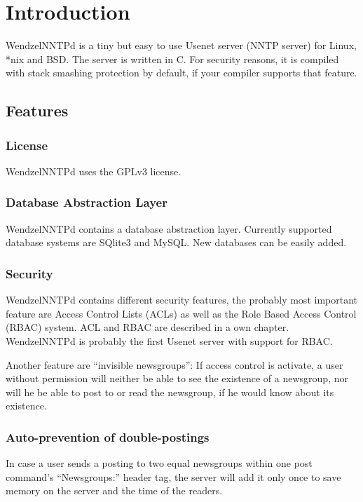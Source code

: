 \chapter{Introduction}

WendzelNNTPd is a tiny but easy to use Usenet server (NNTP server) for Linux, *nix and BSD. The server is written in C. For security reasons, it is compiled with stack smashing protection by default, if your compiler supports that feature.

\section{Features}

\subsection{License}

WendzelNNTPd uses the GPLv3 license.

\subsection{Database Abstraction Layer}

WendzelNNTPd contains a database abstraction layer. Currently supported database systems are SQlite3 and MySQL. New databases can be easily added.

\subsection{Security}

WendzelNNTPd contains different security features, the probably most important feature are Access Control Lists (ACLs) as well as the Role Based Access Control (RBAC) system. ACL and RBAC are described in a own chapter. WendzelNNTPd is probably the first Usenet server with support for RBAC.

Another feature are ``invisible newsgroups'': If access control is activate, a user without permission will neither be able to see the existence of a newsgroup, nor will he be able to post to or read the newsgroup, if he would know about its existence.

\subsection{Auto-prevention of double-postings}

In case a user sends a posting to two equal newsgroups within one post command's ``Newsgroups:'' header tag, the server will add it only once to save memory on the server and the time of the readers.


